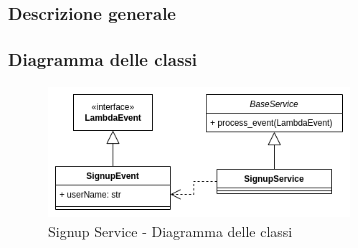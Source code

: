 \subsubsection{Descrizione generale}

\subsubsection{Diagramma delle classi}
\begin{figure}[H]
    \includegraphics[width=8cm]{sezioni/images/cd_signup.png}
    \centering
    \caption{Signup Service - Diagramma delle classi}
\end{figure}
